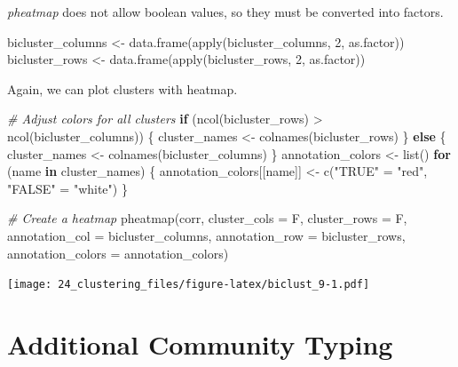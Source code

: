 \documentclass[
]{book}
\newenvironment{Shaded}{\begin{snugshade}}{\end{snugshade}}
\newcommand{\AttributeTok}[1]{\textcolor[rgb]{0.77,0.63,0.00}{#1}}
\newcommand{\CommentTok}[1]{\textcolor[rgb]{0.56,0.35,0.01}{\textit{#1}}}
\newcommand{\ControlFlowTok}[1]{\textcolor[rgb]{0.13,0.29,0.53}{\textbf{#1}}}
\newcommand{\DecValTok}[1]{\textcolor[rgb]{0.00,0.00,0.81}{#1}}
\newcommand{\FunctionTok}[1]{\textcolor[rgb]{0.00,0.00,0.00}{#1}}
\newcommand{\NormalTok}[1]{#1}
\newcommand{\OtherTok}[1]{\textcolor[rgb]{0.56,0.35,0.01}{#1}}
\newcommand{\SpecialCharTok}[1]{\textcolor[rgb]{0.00,0.00,0.00}{#1}}
\newcommand{\StringTok}[1]{\textcolor[rgb]{0.31,0.60,0.02}{#1}}
\begin{document}
\emph{pheatmap} does not allow boolean values, so they must be converted into factors.

\begin{Shaded}
\begin{Highlighting}[]
\NormalTok{bicluster\_columns }\OtherTok{\textless{}{-}} \FunctionTok{data.frame}\NormalTok{(}\FunctionTok{apply}\NormalTok{(bicluster\_columns, }\DecValTok{2}\NormalTok{, as.factor))}
\NormalTok{bicluster\_rows }\OtherTok{\textless{}{-}} \FunctionTok{data.frame}\NormalTok{(}\FunctionTok{apply}\NormalTok{(bicluster\_rows, }\DecValTok{2}\NormalTok{, as.factor))}
\end{Highlighting}
\end{Shaded}

Again, we can plot clusters with heatmap.

\begin{Shaded}
\begin{Highlighting}[]
\CommentTok{\# Adjust colors for all clusters}
\ControlFlowTok{if}\NormalTok{ (}\FunctionTok{ncol}\NormalTok{(bicluster\_rows) }\SpecialCharTok{\textgreater{}} \FunctionTok{ncol}\NormalTok{(bicluster\_columns)) \{}
\NormalTok{    cluster\_names }\OtherTok{\textless{}{-}} \FunctionTok{colnames}\NormalTok{(bicluster\_rows)}
\NormalTok{\} }\ControlFlowTok{else}\NormalTok{ \{}
\NormalTok{    cluster\_names }\OtherTok{\textless{}{-}} \FunctionTok{colnames}\NormalTok{(bicluster\_columns)}
\NormalTok{\}}
\NormalTok{annotation\_colors }\OtherTok{\textless{}{-}} \FunctionTok{list}\NormalTok{()}
\ControlFlowTok{for}\NormalTok{ (name }\ControlFlowTok{in}\NormalTok{ cluster\_names) \{}
\NormalTok{    annotation\_colors[[name]] }\OtherTok{\textless{}{-}} \FunctionTok{c}\NormalTok{(}\StringTok{"TRUE"} \OtherTok{=} \StringTok{"red"}\NormalTok{, }\StringTok{"FALSE"} \OtherTok{=} \StringTok{"white"}\NormalTok{)}
\NormalTok{\}}

\CommentTok{\# Create a heatmap}
\FunctionTok{pheatmap}\NormalTok{(corr, }\AttributeTok{cluster\_cols =}\NormalTok{ F, }\AttributeTok{cluster\_rows =}\NormalTok{ F,}
         \AttributeTok{annotation\_col =}\NormalTok{ bicluster\_columns, }\AttributeTok{annotation\_row =}\NormalTok{ bicluster\_rows,}
         \AttributeTok{annotation\_colors =}\NormalTok{ annotation\_colors)}
\end{Highlighting}
\end{Shaded}

\texttt{[image: 24\_clustering\_files/figure-latex/biclust\_9-1.pdf]}

\hypertarget{additional-community-typing}{%
\section{Additional Community Typing}\label{additional-community-typing}}
\end{document}
